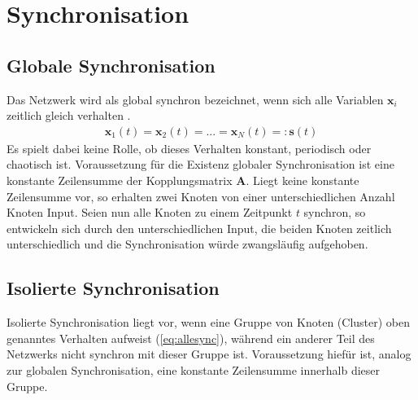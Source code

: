 \section{Synchronisation}
\subsection*{Globale Synchronisation}
Das Netzwerk wird als global synchron bezeichnet, wenn sich alle Variablen $\boldsymbol{x}_i$ zeitlich gleich verhalten \cite{pecora1998}.
\begin{align}\label{eq:allesync}
\boldsymbol{x}_1(t)=\boldsymbol{x}_2(t)=...=\boldsymbol{x}_N(t)=:\boldsymbol{s}(t)
\end{align}
Es spielt dabei keine Rolle, ob dieses Verhalten konstant, periodisch oder chaotisch ist.
Voraussetzung für die Existenz globaler Synchronisation ist eine konstante Zeilensumme der Kopplungsmatrix $\boldsymbol{A}$. Liegt keine konstante Zeilensumme vor, so erhalten zwei Knoten von einer unterschiedlichen Anzahl Knoten Input. Seien nun alle Knoten zu einem Zeitpunkt $t$ synchron, so entwickeln sich durch den unterschiedlichen Input, die beiden Knoten zeitlich unterschiedlich und die Synchronisation würde zwangsläufig aufgehoben.
\subsection*{Isolierte Synchronisation}
Isolierte Synchronisation liegt vor, wenn eine Gruppe von Knoten (Cluster) oben genanntes Verhalten aufweist (\ref{eq:allesync}), während ein anderer Teil des Netzwerks nicht synchron mit dieser Gruppe ist\cite{pecora1998}. Voraussetzung hiefür ist, analog zur globalen Synchronisation, eine konstante Zeilensumme innerhalb dieser Gruppe.

